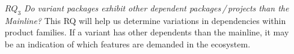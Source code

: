 \begin{itemize}


\item[\textbf{$RQ_3$}] \textit{Do variant packages exhibit other dependent packages\,/\,projects than the Mainline?}
This RQ will help us determine variations in dependencies within product families.
If a variant has other dependents than the mainline, it may be an indication of which features are demanded in the ecosystem.


\end{itemize}
